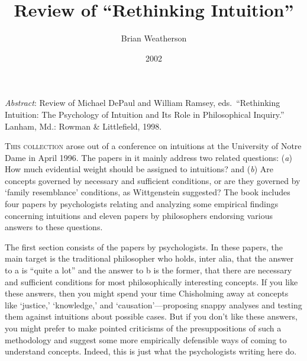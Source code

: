 \documentclass[
  11pt,
  letterpaper,
  DIV=11,
  numbers=noendperiod,
  twoside]{scrartcl}
\title{Review of ``Rethinking Intuition''}
\author{Brian Weatherson}
\date{2002}
\renewenvironment{abstract}
 {\vspace{-1.25cm}
 \quotation\small\noindent\emph{Abstract}:}
 {\endquotation}
\renewenvironment{abstract}
 {\quotation\small\noindent\emph{Abstract}:}
 {\endquotation\vspace{-0.02cm}}
\begin{document}
\maketitle
\begin{abstract}
Review of Michael DePaul and William Ramsey, eds.~``Rethinking
Intuition: The Psychology of Intuition and Its Role in Philosophical
Inquiry.'' Lanham, Md.: Rowman \& Littlefield, 1998.
\end{abstract}


\lettrine{T}{his collection} arose out of a conference on intuitions at
the University of Notre Dame in April 1996. The papers in it mainly
address two related questions: (\emph{a}) How much evidential weight
should be assigned to intuitions? and (\emph{b}) Are concepts governed
by necessary and sufficient conditions, or are they governed by `family
resemblance' conditions, as Wittgenstein suggested? The book includes
four papers by psychologists relating and analyzing some empirical
findings concerning intuitions and eleven papers by philosophers
endorsing various answers to these questions.

The first section consists of the papers by psychologists. In these
papers, the main target is the traditional philosopher who holds, inter
alia, that the answer to a is ``quite a lot'' and the answer to b is the
former, that there are necessary and sufficient conditions for most
philosophically interesting concepts. If you like these answers, then
you might spend your time Chisholming away at concepts like `justice,'
`knowledge,' and `causation'---proposing snappy analyses and testing
them against intuitions about possible cases. But if you don't like
these answers, you might prefer to make pointed criticisms of the
presuppositions of such a methodology and suggest some more empirically
defensible ways of coming to understand concepts. Indeed, this is just
what the psychologists writing here do.
\end{document}

